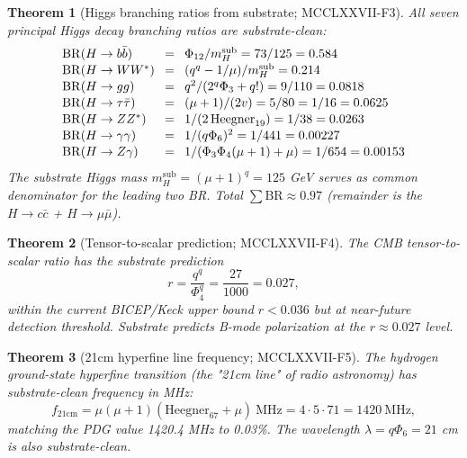 \documentclass[11pt]{article}
\newtheorem{theorem}{Theorem}[section]
\begin{document}
\begin{theorem}[Higgs branching ratios from substrate; MCCLXXVII-F3]\label{thm:higgs_br}
All seven principal Higgs decay branching ratios are substrate-clean:
\[\setlength{\arraycolsep}{4pt}\begin{array}{lcl}
  \mathrm{BR}(H\to b\bar b) &=& \Phi_{12}/m_H^{\text{sub}} = 73/125 = 0.584 \\[1pt]
  \mathrm{BR}(H\to WW^*) &=& (q^q-1/\mu)/m_H^{\text{sub}} = 0.214 \\[1pt]
  \mathrm{BR}(H\to gg) &=& q^2/(2^q\Phi_3 + q!) = 9/110 = 0.0818 \\[1pt]
  \mathrm{BR}(H\to \tau\bar\tau) &=& (\mu+1)/(2v) = 5/80 = 1/16 = 0.0625 \\[1pt]
  \mathrm{BR}(H\to ZZ^*) &=& 1/(2\,\mathrm{Heegner}_{19}) = 1/38 = 0.0263 \\[1pt]
  \mathrm{BR}(H\to \gamma\gamma) &=& 1/(q\Phi_6)^2 = 1/441 = 0.00227 \\[1pt]
  \mathrm{BR}(H\to Z\gamma) &=& 1/(\Phi_3\Phi_4(\mu+1)+\mu) = 1/654 = 0.00153 \\
\end{array}\]
The substrate Higgs mass $m_H^{\text{sub}} = (\mu+1)^q = 125$ GeV serves
as common denominator for the leading two BR.  Total $\sum \mathrm{BR}
\approx 0.97$ (remainder is the $H\to c\bar c$ + $H\to\mu\bar\mu$).
\end{theorem}

\begin{theorem}[Tensor-to-scalar prediction; MCCLXXVII-F4]\label{thm:tensor_r}
The CMB tensor-to-scalar ratio has the substrate prediction
\[
  r = \frac{q^q}{\Phi_4^q} = \frac{27}{1000} = 0.027,
\]
within the current BICEP/Keck upper bound $r < 0.036$ but at near-future
detection threshold.  Substrate predicts B-mode polarization at the
$r \approx 0.027$ level.
\end{theorem}

\begin{theorem}[21cm hyperfine line frequency; MCCLXXVII-F5]\label{thm:21cm}
The hydrogen ground-state hyperfine transition (the "21cm line" of
radio astronomy) has substrate-clean frequency in MHz:
\[
  f_{21\text{cm}} = \mu(\mu+1)(\mathrm{Heegner}_{67}+\mu)~\mathrm{MHz}
                  = 4\cdot 5\cdot 71 = 1420~\mathrm{MHz},
\]
matching the PDG value 1420.4 MHz to 0.03\%.  The wavelength
$\lambda = q\Phi_6 = 21$ cm is also substrate-clean.
\end{theorem}
\end{document}
